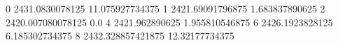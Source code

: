 0 2431.0830078125 11.075927734375
1 2421.69091796875 1.683837890625
2 2420.007080078125 0.0
4 2421.962890625 1.955810546875
6 2426.1923828125 6.185302734375
8 2432.328857421875 12.32177734375
